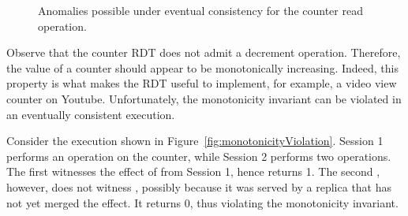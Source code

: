 \begin{figure}[ht]
\centering
{}
\hspace*{0.5in}
\hfill
\caption{Anomalies possible under eventual consistency for the counter
read operation.}
\label{fig:counter_anomalies}
\end{figure}

Observe that the counter RDT does not admit a decrement operation.
Therefore, the value of a counter should appear to be monotonically
increasing. Indeed, this property is what makes the RDT useful to
implement, for example, a video view counter on Youtube.
Unfortunately, the monotonicity invariant can be violated in an
eventually consistent execution.

Consider the execution shown in
Figure~\ref{fig:monotonicityViolation}. Session 1 performs an
 operation on the counter, while Session 2 performs two
 operations. The first  witnesses the effect of
 from Session 1, hence returns 1. The second ,
however, does not witness , possibly because it was served by
a replica that has not yet merged the  effect. It returns 0,
thus violating the monotonicity invariant. 

